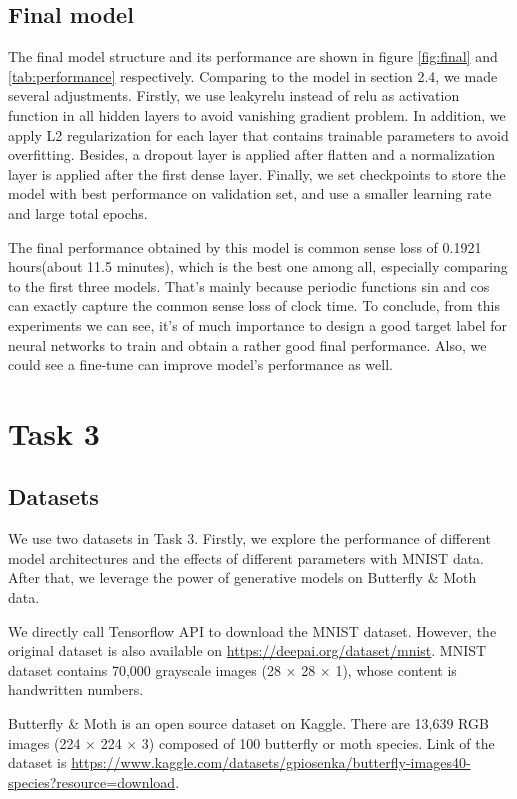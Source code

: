 \documentclass{article}
\begin{document}
\subsection{Final model}

The final model structure and its performance are shown in figure \ref{fig:final} and \ref{tab:performance} respectively. Comparing to the model in section 2.4, we made several adjustments. Firstly, we use leakyrelu instead of relu as activation function in all hidden layers to avoid vanishing gradient problem. In addition, we apply L2 regularization for each layer that contains trainable parameters to avoid overfitting. Besides, a dropout layer is applied after flatten and a normalization layer is applied after the first dense layer. Finally, we set checkpoints to store the model with best performance on validation set, and use a smaller learning rate and large total epochs.

The final performance obtained by this model is common sense loss of 0.1921 hours(about 11.5 minutes), which is the best one among all, especially comparing to the first three models. That's mainly because periodic functions sin and cos can exactly capture the common sense loss of clock time. To conclude, from this experiments we can see, it's of much importance to design a good target label for neural networks to train and obtain a rather good final performance.
Also, we could see a fine-tune can improve model's performance as well.
\section*{Task 3}
\setcounter{section}{3}
\setcounter{subsection}{0}
\subsection{Datasets}
We use two datasets in Task 3. Firstly, we explore the performance of different model architectures and the effects of different parameters with MNIST data. After that, we leverage the power of generative models on Butterfly \& Moth data. \par
We directly call Tensorflow API to download the MNIST dataset. However, the original dataset is also available on \url{https://deepai.org/dataset/mnist}. MNIST dataset contains 70,000 grayscale images (28 $\times$ 28 $\times$ 1), whose content is handwritten numbers. \par
Butterfly \& Moth is an open source dataset on Kaggle. There are 13,639 RGB images (224 $\times$ 224 $\times$ 3) composed of 100 butterfly or moth species. Link of the dataset is \url{https://www.kaggle.com/datasets/gpiosenka/butterfly-images40-species?resource=download}.
\end{document}
